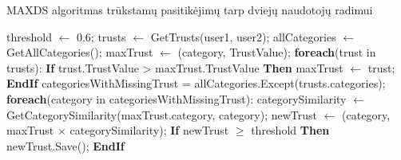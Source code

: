 \documentclass{VUMIFInfMagistrinis}
\begin{document}
\begin{algorithm}
	\caption{MAXDS algoritmas trūkstamų pasitikėjimų tarp dviejų naudotojų radimui}\label{MAXDSalg}
	\begin{algorithmic}[1]
		\State threshold $\gets$ 0.6;
		\State trusts $\gets$ GetTrusts(user1, user2);
		\State allCategories $\gets$ GetAllCategories();
		\State maxTrust $\gets$ (category, TrustValue);
		\State \textbf{foreach}(trust in trusts):
		\State \indent \textbf{If} {trust.TrustValue > maxTrust.TrustValue}  \textbf{Then}
		\State \indent \indent   maxTrust $\gets$ trust;
		\State \indent \textbf{EndIf}
		\State categoriesWithMissingTrust = allCategories.Except(trusts.categories);
		\State \textbf{foreach}(category in categoriesWithMissingTrust):
		\State \indent categorySimilarity $\gets$ GetCategorySimilarity(maxTrust.category, category);
		\State \indent newTrust $\gets$ (category, maxTrust $\times$ categorySimilarity);
		\State \indent \textbf{If} {newTrust $\ge$ threshold} \textbf{Then}
		\State \indent \indent newTrust.Save();
		\State \indent \textbf{EndIf}
		\EndProcedure
	\end{algorithmic}
\end{algorithm}
\end{document}
